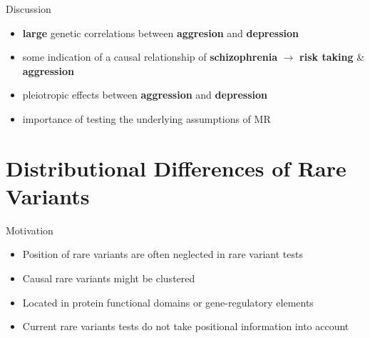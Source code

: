 \documentclass{beamer}
\begin{document}
  \begin{frame}[t]{Discussion}
    \begin{itemize}
      \item \textbf{large} genetic correlations between \textbf{aggresion} and \textbf{depression}
      \item some indication of a causal relationship of \textbf{schizophrenia} $\rightarrow$ \textbf{risk taking} \& \textbf{aggression}
      \item pleiotropic effects between \textbf{aggression} and \textbf{depression} 
      \item importance of testing the underlying assumptions of MR
    \end{itemize} 
  \end{frame}

  \section{Distributional Differences of Rare Variants}

  \begin{frame}[t]{Motivation}
    \begin{itemize}
      \item Position of rare variants are often neglected in rare variant tests
      \item Causal rare variants might be clustered
      \item Located in protein functional domains or gene-regulatory elements
      \item Current rare variants tests do not take positional information into account
    \end{itemize} 
    
  \end{frame}
\end{document}
